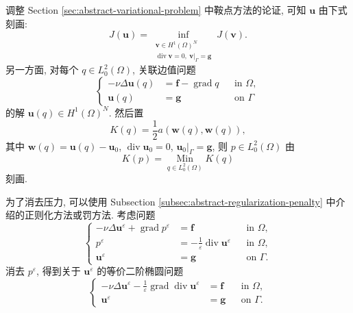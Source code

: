 调整 Section \ref{sec:abstract-variational-problem} 中鞍点方法的论证,
可知 $\mathbf{u}$ 由下式刻画:
\begin{equation}\label{eq:stokes-dirichlet-constrained-energy}
J(\mathbf{u})
=
\inf_{\substack{
\mathbf{v}\in H^1(\Omega)^N\\
\operatorname{div}\mathbf{v}=0,\ 
\mathbf{v}|_\Gamma=\mathbf{g}}}
J(\mathbf{v}).
\end{equation}
另一方面, 对每个 $q\in L_0^2(\Omega)$, 关联边值问题
\begin{equation}\label{eq:stokes-dirichlet-dual-state}
\left\{
\begin{aligned}
-\nu\Delta\mathbf{u}(q)
&=\mathbf{f}-\operatorname{grad}q
&&\text{in }\Omega,\\
\mathbf{u}(q)&=\mathbf{g}
&&\text{on }\Gamma
\end{aligned}
\right.
\end{equation}
的解 $\mathbf{u}(q)\in H^1(\Omega)^N$. 然后置
\begin{equation}\label{eq:stokes-dirichlet-dual-functional}
K(q)=\frac12a(\mathbf{w}(q),\mathbf{w}(q)),
\end{equation}
其中
$\mathbf{w}(q)=\mathbf{u}(q)-\mathbf{u}_0$,
$\operatorname{div}\mathbf{u}_0=0$,
$\mathbf{u}_0|_\Gamma=\mathbf{g}$, 则
$p\in L_0^2(\Omega)$ 由
\begin{equation}\label{eq:stokes-dirichlet-dual-minimum}
K(p)=\operatorname*{Min}_{q\in L_0^2(\Omega)}K(q)
\end{equation}
刻画.

为了消去压力, 可以使用 Subsection
\ref{subsec:abstract-regularization-penalty} 中介绍的正则化方法或罚方法.
考虑问题
\begin{equation}\label{eq:stokes-dirichlet-penalty-system}
\left\{
\begin{aligned}
-\nu\Delta\mathbf{u}^\varepsilon
+\operatorname{grad}p^\varepsilon
&=\mathbf{f}
&&\text{in }\Omega,\\
p^\varepsilon
&=-\frac1\varepsilon
\operatorname{div}\mathbf{u}^\varepsilon
&&\text{in }\Omega,\\
\mathbf{u}^\varepsilon&=\mathbf{g}
&&\text{on }\Gamma.
\end{aligned}
\right.
\end{equation}
消去 $p^\varepsilon$, 得到关于 $\mathbf{u}^\varepsilon$
的等价二阶椭圆问题
\begin{equation}\label{eq:stokes-dirichlet-penalized-elliptic}
\left\{
\begin{aligned}
-\nu\Delta\mathbf{u}^\varepsilon
-\frac1\varepsilon
\operatorname{grad}\operatorname{div}\mathbf{u}^\varepsilon
&=\mathbf{f}
&&\text{in }\Omega,\\
\mathbf{u}^\varepsilon&=\mathbf{g}
&&\text{on }\Gamma.
\end{aligned}
\right.
\end{equation}

